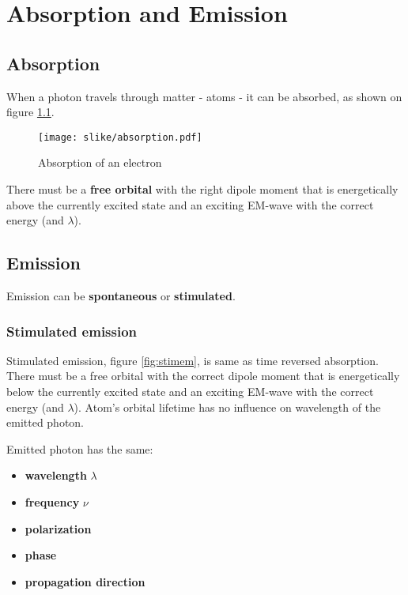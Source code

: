 \chapter{Absorption and Emission}

\section{Absorption}
When a photon travels through matter - atoms - it can be absorbed, as shown on figure
\ref{fig:absorption1}.
\begin{figure}[h!]
    \centering
    \texttt{[image: slike/absorption.pdf]}
    \caption{Absorption of an electron}
    \label{fig:absorption1}
\end{figure}

There must be a \textbf{free orbital} with the right dipole moment that is energetically above the currently excited state and an 
exciting EM-wave with the correct energy (and $\lambda$).

\section{Emission}
Emission can be \textbf{spontaneous} or \textbf{stimulated}.




\subsection{Stimulated emission}
Stimulated emission, figure \ref{fig:stimem}, is same as time reversed absorption. There must be a free orbital with the correct dipole moment that is energetically
below the currently excited state and an exciting EM-wave with the correct energy (and $\lambda$).
Atom's orbital lifetime has no influence on wavelength of the emitted photon.

Emitted photon has the same: \begin{itemize}
        \item \textbf{wavelength } $\lambda$
        \item \textbf{frequency} $\nu$
        \item \textbf{polarization}
        \item \textbf{phase}
        \item \textbf{propagation direction}
    \end{itemize}

